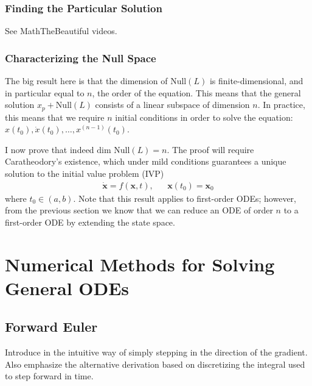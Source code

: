 \documentclass[12pt]{article}
\newcommand{\bx}{\mathbf{x}}
\begin{document}
\subsubsection{Finding the Particular Solution}
See MathTheBeautiful videos. 

\subsubsection{Characterizing the Null Space}
The big result here is that the dimension of $\text{Null}(L)$ is finite-dimensional, and in particular equal to $n$, the order of the equation. This means that the general solution 
$x_p + \text{Null}(L)$ consists of a linear subspace of dimension $n$. In practice, this means that we require $n$ initial conditions in order to solve the equation: 
$x(t_0), \dot{x}(t_0), \dots, x^{(n-1)}(t_0)$. 

I now prove that indeed $\text{dim } \text{Null}(L) = n$. The proof will require Caratheodory's existence, which under mild conditions guarantees a unique solution to the initial value problem (IVP) 
\begin{align*}
\dot{\bx} = f(\bx, t), && \bx(t_0) = \bx_0
\end{align*}
where $t_0 \in (a, b)$. Note that this result applies to first-order ODEs; however, from the previous section we know that we can reduce an ODE of order $n$ to a first-order ODE 
by extending the state space. 


\section{Numerical Methods for Solving General ODEs}

\subsection{Forward Euler}
Introduce in the intuitive way of simply stepping in the direction of the gradient. Also emphasize the alternative derivation based on discretizing the integral used to 
step forward in time. 
\end{document}
